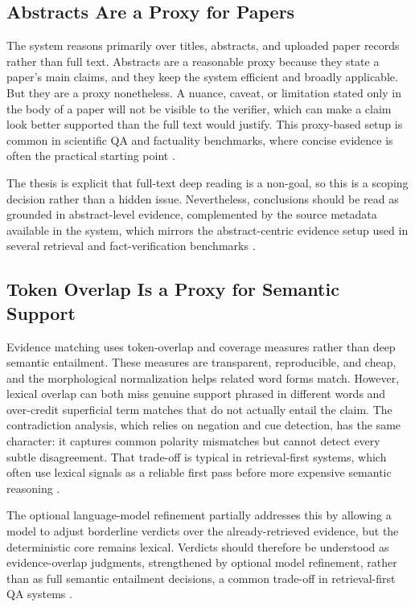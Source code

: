 \subsection{Abstracts Are a Proxy for Papers }

The system reasons primarily over titles, abstracts, and uploaded paper records rather than full text. Abstracts are
a reasonable proxy because they state a paper's main claims, and they keep the system efficient and broadly
applicable. But they are a proxy nonetheless. A nuance, caveat, or limitation stated only in the body of a paper
will not be visible to the verifier, which can make a claim look better supported than the full text would justify.
This proxy-based setup is common in scientific QA and factuality benchmarks, where concise evidence is often the
practical starting point \cite{thorne2018fever,wadden2020scifact,huang2023hallucinationsurvey}.

The thesis is explicit that full-text deep reading is a non-goal, so this is a scoping decision rather than a hidden
issue. Nevertheless, conclusions should be read as grounded in abstract-level evidence, complemented by the source
metadata available in the system, which mirrors the abstract-centric evidence setup used in several retrieval and
fact-verification benchmarks \cite{thorne2018fever,wadden2020scifact,petroni2020kilt}.

\subsection{Token Overlap Is a Proxy for Semantic Support }

Evidence matching uses token-overlap and coverage measures rather than deep semantic entailment. These measures are
transparent, reproducible, and cheap, and the morphological normalization helps related word forms match. However,
lexical overlap can both miss genuine support phrased in different words and over-credit superficial term matches
that do not actually entail the claim. The contradiction analysis, which relies on negation and cue detection, has
the same character: it captures common polarity mismatches but cannot detect every subtle disagreement.
That trade-off is typical in retrieval-first systems, which often use lexical signals as a reliable first pass before
more expensive semantic reasoning \cite{karpukhin2020dpr,khattab2020colbert,guu2020realm}.

The optional language-model refinement partially addresses this by allowing a model to adjust borderline verdicts
over the already-retrieved evidence, but the deterministic core remains lexical. Verdicts should therefore be
understood as evidence-overlap judgments, strengthened by optional model refinement, rather than as full semantic
entailment decisions, a common trade-off in retrieval-first QA systems \cite{karpukhin2020dpr,khattab2020colbert,guu2020realm}.

